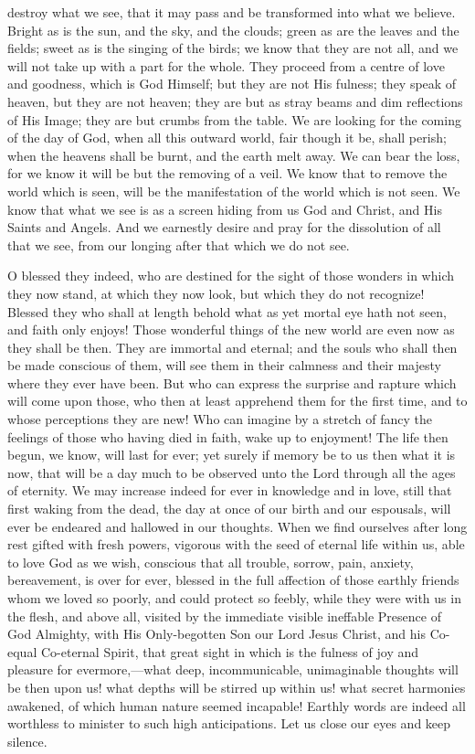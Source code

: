 destroy what we see, that it may pass and be transformed into what we
believe. Bright as is the sun, and the sky, and the clouds; green as
are the leaves and the fields; sweet as is the singing of the birds;
we know that they are not all, and we will not take up with a part for
the whole. They proceed from a centre of love and goodness, which is
God Himself; but they are not His fulness; they speak of heaven, but
they are not heaven; they are but as stray beams and dim reflections of
His Image; they are but crumbs from the table. We are looking for the
coming of the day of God, when all this outward world, fair though it
be, shall perish; when the heavens shall be burnt, and the earth melt
away. We can bear the loss, for we know it will be but the removing of
a veil. We know that to remove the world which is seen, will be the
manifestation of the world which is not seen. We know that what we see
is as a screen hiding from us God and Christ, and His Saints and
Angels. And we earnestly desire and pray for the dissolution of all
that we see, from our longing after that which we do not see.

O blessed they indeed, who are destined for the sight of those
wonders in which they now stand, at which they now look, but which
they do not recognize! Blessed they who shall at length behold what as
yet mortal eye hath not seen, and faith only enjoys! Those wonderful
things of the new world are even now as they shall be then. They are
immortal and eternal; and the souls who shall then be made conscious
of them, will see them in their calmness and their majesty where they
ever have been. But who can express the surprise and rapture which
will come upon those, who then at least apprehend them for the first
time, and to whose perceptions they are new! Who can imagine by a
stretch of fancy the feelings of those who having died in faith, wake
up to enjoyment! The life then begun, we know, will last for ever; yet
surely if memory be to us then what it is now, that will be a day much
to be observed unto the Lord through all the ages of eternity. We may
increase indeed for ever in knowledge and in love, still that first
waking from the dead, the day at once of our birth and our espousals,
will ever be endeared and hallowed in our thoughts. When we find
ourselves after long rest gifted with fresh powers, vigorous with the
seed of eternal life within us, able to love God as we wish, conscious
that all trouble, sorrow, pain, anxiety, bereavement, is over for
ever, blessed in the full affection of those earthly friends whom we
loved so poorly, and could protect so feebly, while they were with us
in the flesh, and above all, visited by the immediate visible
ineffable Presence of God Almighty, with His Only-begotten Son our
Lord Jesus Christ, and his Co-equal Co-eternal Spirit, that great
sight in which is the fulness of joy and pleasure for evermore,—what
deep, incommunicable, unimaginable thoughts will be then upon us! what
depths will be stirred up within us! what secret harmonies awakened,
of which human nature seemed incapable! Earthly words are indeed all
worthless to minister to such high anticipations. Let us close our
eyes and keep silence.

